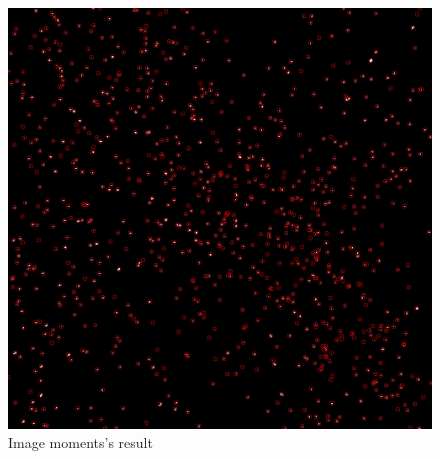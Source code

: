 \begin{figure}
	\centerline{\includegraphics[width=\locateimgsize]{images/locate/opencv moments.png}}
	\caption{\centering Image moments's result}
	\label{fig:locate:moments}
\end{figure}
